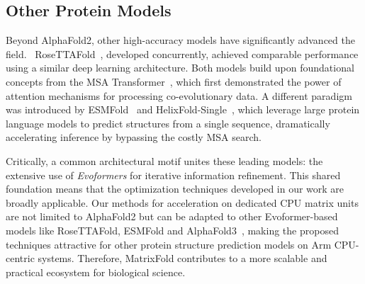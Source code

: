

\subsection{Other Protein Models}
Beyond AlphaFold2, other high-accuracy models have significantly advanced the field.~\cite{xu2019distance,zhou2022tasser} RoseTTAFold~\cite{baek2021accurate}, developed concurrently, achieved comparable performance using a similar deep learning architecture. Both models build upon foundational concepts from the MSA Transformer~\cite{rao2021msa}, which first demonstrated the power of attention mechanisms for processing co-evolutionary data. A different paradigm was introduced by ESMFold~\cite{lin2022language} and HelixFold-Single~\cite{fang2023helixfoldsingle}, which leverage large protein language models to predict structures from a single sequence, dramatically accelerating inference by bypassing the costly MSA search.

Critically, a common architectural motif unites these leading models: the extensive use of \textit{Evoformers} for iterative information refinement. This shared foundation means that the optimization techniques developed in our work are broadly applicable. Our methods for acceleration on dedicated CPU matrix units are not limited to AlphaFold2 but can be adapted to other Evoformer-based models like RoseTTAFold, ESMFold and AlphaFold3~\cite{abramson2024accurate}, making the proposed techniques attractive for other protein structure prediction models on Arm CPU-centric systems.
Therefore, MatrixFold contributes to a more scalable and practical ecosystem for biological science.